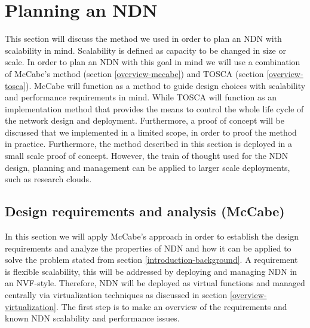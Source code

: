 \section{Planning an NDN}
\label{planning-ndn}
This section will discuss the method we used in order to plan an NDN with scalability in mind. Scalability is defined as capacity to be changed in size or scale. In order to plan an NDN with this goal in mind we will use a combination of McCabe's method (section \ref{overview-mccabe}) and TOSCA (section \ref{overview-tosca}). McCabe will function as a method to guide design choices with scalability and performance requirements in mind. While TOSCA will function as an implementation method that provides the means to control the whole life cycle of the network design and deployment. Furthermore, a proof of concept will be discussed that we implemented in a limited scope, in order to proof the method in practice. Furthermore, the method described in this section is deployed in a small scale proof of concept. However, the train of thought used for the NDN design, planning and management can be applied to larger scale deployments, such as research clouds.

\subsection{Design requirements and analysis (McCabe)}
\label{planning-requirements}
In this section we will apply McCabe's approach in order to establish the design requirements and analyze the properties of NDN and how it can be applied to solve the problem stated from section \ref{introduction-background}. A requirement is flexible scalability, this will be addressed by deploying and managing NDN in an NVF-style. Therefore, NDN will be deployed as virtual functions and managed centrally via virtualization techniques as discussed in section \ref{overview-virtualization}. The first step is to make an overview of the requirements and known NDN scalability and performance issues.

